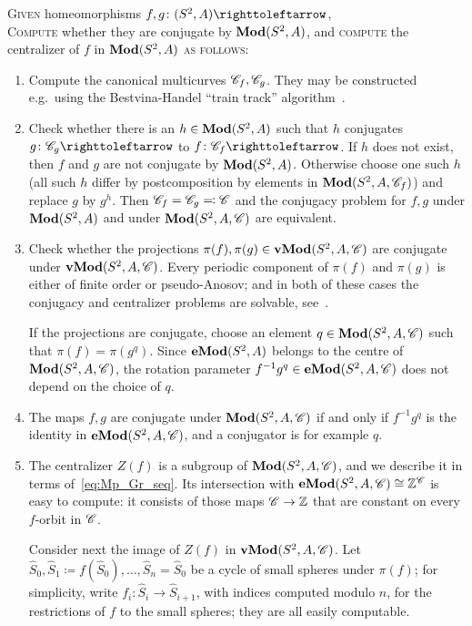\documentclass{amsart}
\begin{document}
\begin{algo}\label{algo:conjmcg}
  \textsc{Given} homeomorphisms $f,g\colon(S^2,A)\selfmap$,\\
  \textsc{Compute} whether they are conjugate by $\Mod(S^2,A)$, and \textsc{compute} the centralizer of $f$ in $\Mod(S^2,A)$ \textsc{as follows:}\upshape
  \begin{enumerate}
  \item Compute the canonical multicurves $\CC_f,\CC_g$. They may be
    constructed e.g.\ using the Bestvina-Handel ``train track''
    algorithm~\cite{bestvina-h:tt}.

  \item Check whether there is an $h\in \Mod(S^2,A)$ such that $h$
    conjugates $g\colon \CC_g\selfmap$ to $f\colon \CC_f\selfmap$. If
    $h$ does not exist, then $f$ and $g$ are not conjugate by
    $\Mod(S^2,A)$. Otherwise choose one such $h$ (all such $h$ differ
    by postcomposition by elements in $\Mod(S^2,A,\CC_f)$) and replace
    $g$ by $g^h$.  Then $\CC_f=\CC_g\eqqcolon\CC$ and the conjugacy
    problem for $f,g$ under $\Mod(S^2,A)$ and under $\Mod(S^2,A,\CC)$
    are equivalent.

  \item Check whether the projections
    $\pi(f),\pi(g)\in\Mod[v](S^2,A,\CC)$ are conjugate under
    $\Mod[v](S^2,A,\CC)$. Every periodic component of $\pi(f)$ and
    $\pi(g)$ is either of finite order or pseudo-Anosov; and in both
    of these cases the conjugacy and centralizer problems are
    solvable, see~\cite{hemion:homeos}.

    If the projections are conjugate, choose an element
    $q\in\Mod(S^2,A,\CC)$ such that $\pi(f)=\pi(g^q)$. Since
    $\Mod[e](S^2,A)$ belongs to the centre of $\Mod(S^2,A,\CC)$, the rotation
    parameter $f^{-1}g^q\in\Mod[e](S^2,A,\CC)$ does not depend on the
    choice of $q$.
  \item The maps $f,g$ are conjugate under $\Mod(S^2,A,\CC)$ if and
    only if $f^{-1}g^q$ is the identity in $\Mod[e](S^2,A,\CC)$, and a
    conjugator is for example $q$.

  \item The centralizer $Z(f)$ is a subgroup of $\Mod(S^2,A,\CC)$, and
    we describe it in terms of~\eqref{eq:Mp_Gr_seq}. Its intersection
    with $\Mod[e](S^2,A,\CC)\cong\Z^\CC$ is easy to compute: it
    consists of those maps $\CC\to\Z$ that are constant on every
    $f$-orbit in $\CC$.

    Consider next the image of $Z(f)$ in $\Mod[v](S^2,A,\CC)$. Let
    $\widehat S_0,\widehat S_1\coloneqq f( \widehat
    S_0),\dots,\widehat S_n= \widehat S_0$ be a cycle of small spheres
    under $\pi(f)$; for simplicity, write
    $f_i\colon \widehat S_i\to \widehat S_{i+1}$, with indices
    computed modulo $n$, for the restrictions of $f$ to the small
    spheres; they are all easily computable.


\end{enumerate}
\end{algo}
\end{document}
